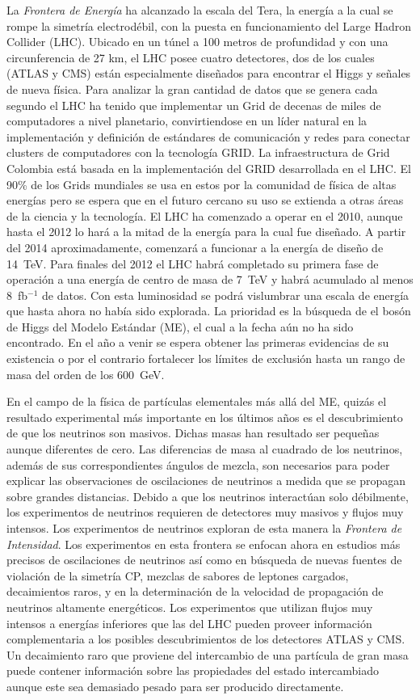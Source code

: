 La \emph{Frontera de Energía} ha alcanzado la escala del Tera, la
energía a la cual se rompe la simetría electrodébil, con la puesta en
funcionamiento del Large Hadron Collider (LHC). Ubicado en un túnel a
100 metros de profundidad y con una circunferencia de 27 km, el LHC
posee cuatro detectores, dos de los cuales (ATLAS y CMS) están
especialmente diseñados para encontrar el Higgs y señales de nueva
física. Para analizar la gran cantidad de datos que se genera cada
segundo el LHC ha tenido que implementar un Grid de decenas de miles
de computadores a nivel planetario, convirtiendose en un líder natural
en la implementación y definición de estándares de comunicación y
redes para conectar clusters de computadores con la tecnología
GRID. La infraestructura de Grid Colombia está basada en la
implementación del GRID desarrollada en el LHC. El 90\% de los Grids
mundiales se usa en estos por la comunidad de física de
altas energías pero se espera que en el futuro cercano su uso se
extienda a otras áreas de la ciencia y la tecnología. El LHC ha
comenzado a operar en el 2010, aunque hasta el 2012 lo hará a la mitad
de la energía para la cual fue diseñado. A partir del 2014
aproximadamente, comenzará a funcionar a la energía de diseño de
14~TeV. Para finales del 2012 el LHC habrá completado su primera fase
de operación a una energía de centro de masa de 7~TeV y habrá
acumulado al menos 8~fb$^{-1}$ de datos. Con esta luminosidad se podrá
vislumbrar una escala de energía que hasta ahora no había sido
explorada. La prioridad es la búsqueda de el bosón de Higgs del Modelo Estándar (ME),
el cual a la fecha aún no ha sido encontrado. En el año a venir
se espera obtener las primeras evidencias de su existencia o
por el contrario fortalecer los límites de exclusión hasta un rango de masa
del orden de los 600~GeV.

En el campo de la física de partículas elementales más allá del
ME, quizás el resultado experimental más importante
en los últimos años es el descubrimiento de que los neutrinos
son masivos. Dichas masas han resultado ser pequeñas aunque diferentes de
cero. Las diferencias de masa al cuadrado de los neutrinos, además de sus
correspondientes ángulos de mezcla, son necesarios para poder explicar
las observaciones de oscilaciones de neutrinos a medida que se
propagan sobre grandes distancias. Debido a que los neutrinos
interactúan solo débilmente, los experimentos de neutrinos requieren
de detectores muy masivos y flujos muy
intensos. Los experimentos de neutrinos exploran de esta manera la
\emph{Frontera de Intensidad}. Los experimentos en esta frontera se
enfocan ahora en estudios más precisos de oscilaciones de neutrinos
así como en búsqueda de nuevas fuentes de violación de la simetría CP, mezclas de
sabores de leptones cargados, decaimientos raros, y en la
determinación de la velocidad de propagación de neutrinos altamente
energéticos. Los experimentos que utilizan flujos muy intensos a energías
inferiores que las del LHC pueden proveer información complementaria a los
posibles descubrimientos de los detectores ATLAS y CMS. Un decaimiento
raro que proviene del intercambio de una partícula de gran masa puede
contener información sobre las propiedades del estado intercambiado
aunque este sea demasiado pesado para ser producido directamente.


